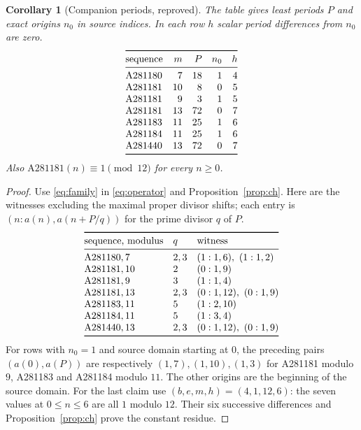 \documentclass[11pt]{article}
\newtheorem{corollary}[theorem]{Corollary}
\begin{document}
\begin{corollary}[Companion periods, reproved]\label{cor:periods}
The table gives least periods $P$ and exact origins $n_0$ in source
indices. In each row $h$ scalar period differences from $n_0$ are zero.
\[
\begin{array}{@{}lrrrr@{}}\toprule
 \text{sequence}&m&P&n_0&h\\\midrule
 \mathrm{A281180}&7&18&1&4\\
 \mathrm{A281181}&10&8&0&5\\
 \mathrm{A281181}&9&3&1&5\\
 \mathrm{A281181}&13&72&0&7\\
 \mathrm{A281183}&11&25&1&6\\
 \mathrm{A281184}&11&25&1&6\\
 \mathrm{A281440}&13&72&0&7\\\bottomrule
\end{array}
\]
Also $\mathrm{A281181}(n)\equiv1\pmod{12}$ for every $n\geq0$.
\end{corollary}
\begin{proof}
Use \eqref{eq:family} in \eqref{eq:operator} and Proposition~\ref{prop:ch}.
Here are the witnesses excluding the maximal proper divisor shifts;
each entry is $(n:a(n),a(n+P/q))$ for the prime divisor $q$ of $P$.
\[
\begin{array}{@{}lll@{}}\toprule
 \text{sequence, modulus}&q&\text{witness}\\\midrule
 \mathrm{A281180},7&2,3&(1:1,6),\ (1:1,2)\\
 \mathrm{A281181},10&2&(0:1,9)\\
 \mathrm{A281181},9&3&(1:1,4)\\
 \mathrm{A281181},13&2,3&(0:1,12),\ (0:1,9)\\
 \mathrm{A281183},11&5&(1:2,10)\\
 \mathrm{A281184},11&5&(1:3,4)\\
 \mathrm{A281440},13&2,3&(0:1,12),\ (0:1,9)\\\bottomrule
\end{array}
\]
For rows with $n_0=1$ and source domain starting at $0$, the preceding
pairs $(a(0),a(P))$ are respectively $(1,7),(1,10),(1,3)$ for
A281181 modulo $9$, A281183 and A281184 modulo $11$.
The other origins are the beginning of the source domain.
For the last claim use $(b,e,m,h)=(4,1,12,6)$: the seven values at
$0\leq n\leq6$ are all $1$ modulo $12$. Their six successive
differences and Proposition~\ref{prop:ch} prove the constant residue.
\end{proof}
\end{document}
